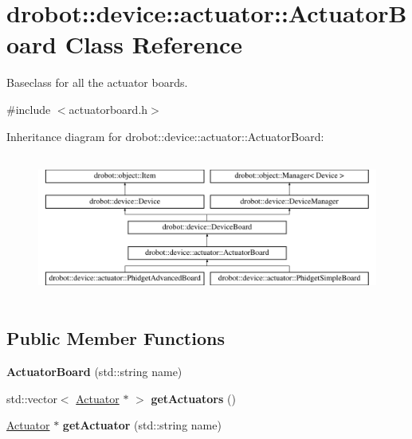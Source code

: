 \hypertarget{classdrobot_1_1device_1_1actuator_1_1ActuatorBoard}{\section{drobot\-:\-:device\-:\-:actuator\-:\-:Actuator\-Board Class Reference}
\label{classdrobot_1_1device_1_1actuator_1_1ActuatorBoard}
}


Baseclass for all the actuator boards.  




{\ttfamily \#include $<$actuatorboard.\-h$>$}

Inheritance diagram for drobot\-:\-:device\-:\-:actuator\-:\-:Actuator\-Board\-:\begin{figure}[H]
\begin{center}
\leavevmode
\includegraphics[height=4.794520cm]{classdrobot_1_1device_1_1actuator_1_1ActuatorBoard}
\end{center}
\end{figure}
\subsection*{Public Member Functions}
\begin{DoxyCompactItemize}
\item 
\hypertarget{classdrobot_1_1device_1_1actuator_1_1ActuatorBoard_aa869681bee8e71c28b531457d0ba057c}{{\bfseries Actuator\-Board} (std\-::string name)}\label{classdrobot_1_1device_1_1actuator_1_1ActuatorBoard_aa869681bee8e71c28b531457d0ba057c}

\item 
\hypertarget{classdrobot_1_1device_1_1actuator_1_1ActuatorBoard_ac76eda87a74d2701c9ce686ccc2b5932}{std\-::vector$<$ \hyperlink{classdrobot_1_1device_1_1actuator_1_1Actuator}{Actuator} $\ast$ $>$ {\bfseries get\-Actuators} ()}\label{classdrobot_1_1device_1_1actuator_1_1ActuatorBoard_ac76eda87a74d2701c9ce686ccc2b5932}

\item 
\hypertarget{classdrobot_1_1device_1_1actuator_1_1ActuatorBoard_a5cb7e13fef66d8aef30ad8ea1d509dcd}{\hyperlink{classdrobot_1_1device_1_1actuator_1_1Actuator}{Actuator} $\ast$ {\bfseries get\-Actuator} (std\-::string name)}\label{classdrobot_1_1device_1_1actuator_1_1ActuatorBoard_a5cb7e13fef66d8aef30ad8ea1d509dcd}

\end{DoxyCompactItemize}
